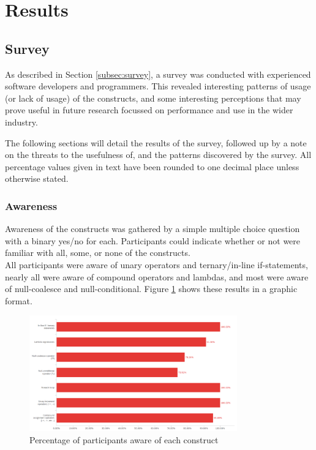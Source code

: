 \documentclass{article}
\begin{document}
\newpage
\section{Results}
    \subsection{Survey}
    \label{subsec:results}
        As described in Section \ref{subsec:survey}, a survey was conducted with experienced software developers and programmers. This revealed interesting patterns of usage (or lack of usage) of the constructs, and some interesting perceptions that may prove useful in future research focussed on performance and use in the wider industry.

        The following sections will detail the results of the survey, followed up by a note on the threats to the usefulness of, and the patterns discovered by the survey. All percentage values given in text have been rounded to one decimal place unless otherwise stated.
        \subsubsection{Awareness}
            Awareness of the constructs was gathered by a simple multiple choice question with a binary yes/no for each. Participants could indicate whether or not were familiar with all, some, or none of the constructs.
            \\\newline
            All participants were aware of unary operators and ternary/in-line if-statements, nearly all were aware of compound operators and lambdas, and most were aware of null-coalesce and null-conditional. Figure \ref{fig:awareness} shows these results in a graphic format.

            \begin{figure}[htbp]
                \centering
                \includegraphics[width=0.8\textwidth]{awareness}
                \caption{Percentage of participants aware of each construct}
                \label{fig:awareness}
            \end{figure}
\end{document}
